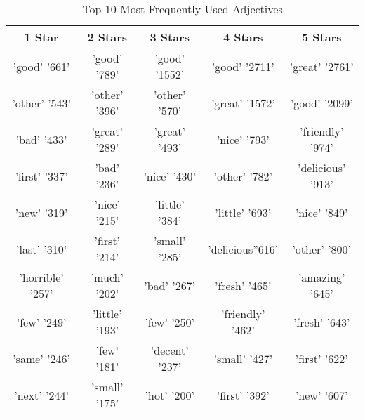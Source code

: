     \begin{center}
        \tiny
        \begin{table}[!h]
        \caption{Top 10 Most Frequently Used Adjectives}
            \begin{tabular}{c | c | c | c | c}
                1 Star & 2 Stars & 3 Stars & 4 Stars & 5 Stars\\\hline
                'good' '661' & 'good' '789' & 'good' '1552' & 'good' '2711' & 'great' '2761'\\
                'other' '543' & 'other' '396' & 'other' '570' & 'great' '1572' & 'good' '2099'\\
                'bad' '433' & 'great' '289' & 'great' '493' & 'nice' '793' & 'friendly' '974'\\
                'first' '337' & 'bad' '236' & 'nice' '430' & 'other' '782' & 'delicious' '913'\\
                'new' '319' & 'nice' '215' & 'little' '384' & 'little' '693' & 'nice' '849'\\
                'last' '310' & 'first' '214' & 'small' '285' & 'delicious''616' & 'other' '800'\\
                'horrible' '257' & 'much' '202' & 'bad' '267' & 'fresh' '465' & 'amazing' '645'\\
                'few' '249' & 'little' '193' & 'few' '250' & 'friendly' '462' & 'fresh' '643'\\
                'same' '246' & 'few' '181' & 'decent' '237' & 'small' '427' & 'first' '622'\\
                'next' '244' & 'small' '175' & 'hot' '200' & 'first' '392' & 'new' '607'\\
                 
            \end{tabular}
        \end{table}
    \end{center}
    
